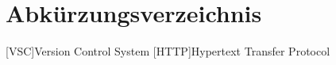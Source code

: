 \chapter*{Abkürzungsverzeichnis}

\begin{acronym}
  [VSC]{Version Control System}
  [HTTP]{Hypertext Transfer Protocol}
\end{acronym}
